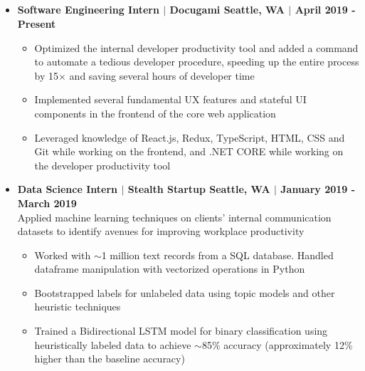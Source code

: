 \documentclass[12pt]{article}
\newcommand{\work}[4]{\textbf{#2 $|$ #1 \hfill #3 $|$ #4}}
\begin{document}
\begin{spacing}{0.25}
\section*{\color{crimson}{Employment}}
\begin{itemize}
\setlength\itemsep{0.1em}
    \item \work{Docugami}{Software Engineering Intern}{Seattle, WA}{April 2019 - Present}\\
    \begin{itemize}
    \item Optimized the internal developer productivity tool and added a command to automate a tedious developer procedure, speeding up the entire process by 15$\times$ and saving several hours of developer time
    \item Implemented several fundamental UX features and stateful UI components in the frontend of the core web application 
    \item Leveraged knowledge of React.js, Redux, TypeScript, HTML, CSS and Git while working on the frontend, and .NET CORE while working on the developer productivity tool
    \end{itemize}
    \item \work{Stealth Startup}{Data Science Intern}{Seattle, WA}{January 2019 - March 2019}\\
        Applied machine learning techniques on clients' internal communication datasets to identify avenues for improving workplace productivity
        \begin{itemize}
            \item Worked with $\sim$1 million text records from a SQL database. Handled dataframe manipulation with vectorized operations in Python
            \item Bootstrapped labels for unlabeled data using topic models and other heuristic techniques
            \item Trained a Bidirectional LSTM model for binary classification using heuristically labeled data to achieve $\sim$85\% accuracy (approximately 12\% higher than the baseline accuracy)
        \end{itemize}
    \end{itemize}

\end{spacing}
\end{document}
